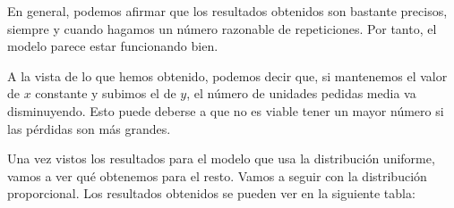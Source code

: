 \documentclass[11pt,a4paper]{report}
\begin{document}
En general, podemos afirmar que los resultados obtenidos son bastante precisos, siempre y cuando hagamos un número
razonable de repeticiones. Por tanto, el modelo parece estar funcionando bien.

A la vista de lo que hemos obtenido, podemos decir que, si mantenemos el valor de $x$ constante y subimos el de $y$,
el número de unidades pedidas media va disminuyendo. Esto puede deberse a que no es viable tener un mayor número si
las pérdidas son más grandes.

Una vez vistos los resultados para el modelo que usa la distribución uniforme, vamos a ver qué obtenemos para el resto.
Vamos a seguir con la distribución proporcional. Los resultados obtenidos se pueden ver en la siguiente tabla:

\begin{table}[H]
\end{table}
\end{document}
